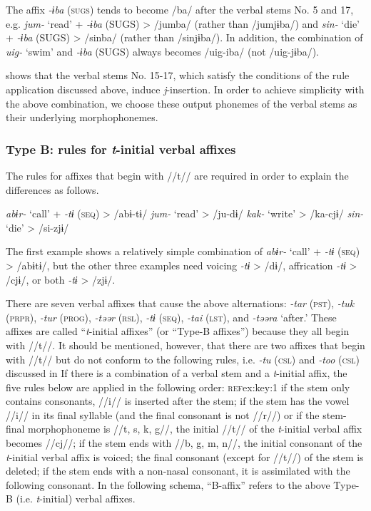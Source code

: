 The affix \textit{-ɨba} (\textsc{sugs}) tends to become /ba/ after the verbal stems No. 5 and 17, e.g. \textit{jum-} ‘read’ + \textit{-ɨba} (SUGS) > /jumba/ (rather than /jumjɨba/) and \textit{sin-} ‘die’ + \textit{-ɨba} (SUGS) > /sinba/ (rather than /sinjɨba/). In addition, the combination of \textit{uig-} ‘swim’ and \textit{-ɨba} (SUGS) always becomes /uig-iba/ (not /uig-jɨba/).

 shows that the verbal stems No. 15-17, which satisfy the conditions of the rule application discussed above, induce \textit{j}-insertion. In order to achieve simplicity with the above combination, we choose these output phonemes of the verbal stems as their underlying morphophonemes.

\subsubsection{Type B: rules for \textit{t}-initial verbal affixes}
\label{bkm:Ref347175824}
The rules for affixes that begin with //t// are required in order to explain the differences as follows.

\ea\label{ex:8-12}
    \ea \textit{abɨr-}  ‘call’  +  \textit{-tɨ} (\textsc{seq})  >  /abɨ-tɨ/
    \ex \textit{jum-}  ‘read’        >  /ju-dɨ/
    \ex \textit{kak-}  ‘write’        >  /ka-cjɨ/
    \ex \textit{sin-}  ‘die’        >  /si-zjɨ/
    \z
\z

The first example shows a relatively simple combination of \textit{abɨr-} ‘call’ + \textit{-tɨ} (\textsc{seq}) > /abɨtɨ/, but the other three examples need voicing \textit{-tɨ} > /dɨ/, affrication \textit{-tɨ} > /cjɨ/, or both \textit{-tɨ} > /zjɨ/.

There are seven verbal affixes that cause the above alternations: \textit{-tar} (\textsc{pst}), \textit{-tuk} (\textsc{prpr}), \textit{-tur} (\textsc{prog}), \textit{-təər} (\textsc{rsl}), \textit{-tɨ} (\textsc{seq}), \textit{-tai} (\textsc{lst}), and \textit{-təəra} ‘after.’ These affixes are called “\textit{t}-initial affixes” (or “Type-B affixes”) because they all begin with //t//. It should be mentioned, however, that there are two affixes that begin with //t// but do not conform to the following rules, i.e. \textit{-tu} (\textsc{csl}) and \textit{-too} (\textsc{csl}) discussed in  If there is a combination of a verbal stem and a \textit{t}-initial affix, the five rules below are applied in the following order: \textsc{ref}{ex:key:1} if the stem only contains consonants, //i// is inserted after the stem;  if the stem has the vowel //i// in its final syllable (and the final consonant is not //r//) or if the stem-final morphophoneme is //t, s, k, g//, the initial //t// of the \textit{t}-initial verbal affix becomes //cj//;  if the stem ends with //b, g, m, n//, the initial consonant of the \textit{t}-initial verbal affix is voiced;  the final consonant (except for //t//) of the stem is deleted;  if the stem ends with a non-nasal consonant, it is assimilated with the following consonant. In the following schema, “B-affix” refers to the above Type-B (i.e. \textit{t}-initial) verbal affixes.

